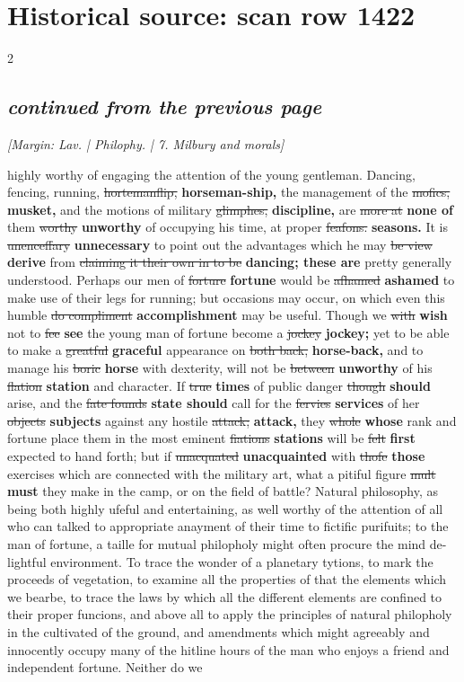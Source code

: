 \documentclass[10pt]{article}
\begin{document}
\section*{Historical source: scan row 1422}
\begin{multicols}{2}
\subsection*{\textit{continued from the previous page}}
{\small\itshape [Margin: Lav. | Philophy. | 7. Milbury and morals]}\par
highly worthy of engaging the attention of the young gentleman. Dancing, fencing, running, \sout{hortemanflip,} \textbf{horseman-ship,} the management of the \sout{mofics,} \textbf{musket,} and the motions of military \sout{glimphes,} \textbf{discipline,} are \sout{more at} \textbf{none of} them \sout{worthy} \textbf{unworthy} of occupying his time, at proper \sout{feafons.} \textbf{seasons.} It is \sout{unenceffary} \textbf{unnecessary} to point out the advantages which he may \sout{be view} \textbf{derive} from \sout{claiming it their own in to be} \textbf{dancing; these are} pretty generally understood. Perhaps our men of \sout{forture} \textbf{fortune} would be \sout{afhamed} \textbf{ashamed} to make use of their legs for running; but occasions may occur, on which even this humble \sout{do compliment} \textbf{accomplishment} may be useful. Though we \sout{with} \textbf{wish} not to \sout{fee} \textbf{see} the young man of fortune become a \sout{jockey} \textbf{jockey;} yet to be able to make a \sout{greatful} \textbf{graceful} appearance on \sout{both back,} \textbf{horse-back,} and to manage his \sout{boric} \textbf{horse} with dexterity, will not be \sout{between} \textbf{unworthy} of his \sout{flation} \textbf{station} and character. If \sout{true} \textbf{times} of public danger \sout{though} \textbf{should} arise, and the \sout{fate founds} \textbf{state should} call for the \sout{fervies} \textbf{services} of her \sout{objects} \textbf{subjects} against any hostile \sout{attack;} \textbf{attack,} they \sout{whole} \textbf{whose} rank and fortune place them in the most eminent \sout{fiations} \textbf{stations} will be \sout{felt} \textbf{first} expected to hand forth; but if \sout{unacquated} \textbf{unacquainted} with \sout{thofe} \textbf{those} exercises which are connected with the military art, what a pitiful figure \sout{mult} \textbf{must} they make in the camp, or on the field of battle? Natural philosophy, as being both highly ufeful and entertaining, as well worthy of the attention of all who can talked to appropriate anayment of their time to fictific purifuits; to the man of fortune, a taille for mutual philopholy might often procure the mind de-lightful environment. To trace the wonder of a planetary tytions, to mark the proceeds of vegetation, to examine all the properties of that the elements which we bearbe, to trace the laws by which all the different elements are confined to their proper funcions, and above all to apply the principles of natural philopholy in the cultivated of the ground, and amendments which might agreeably and innocently occupy many of the hitline hours of the man who enjoys a friend and independent fortune. Neither do we 
\end{multicols}
\end{document}
